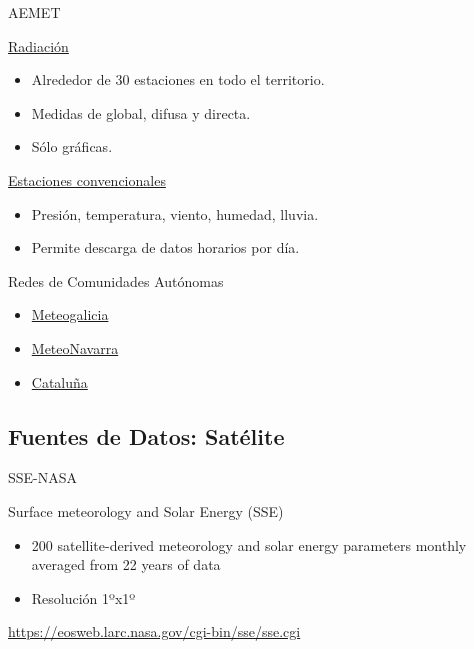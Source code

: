 \documentclass[xcolor={usenames,svgnames,dvipsnames}]{beamer}
\begin{document}
\begin{frame}[label=sec-6-5-6]{AEMET}
\begin{block}{\href{http://www.aemet.es/es/eltiempo/observacion/radiacion}{Radiación}}
\begin{itemize}
\item Alrededor de 30 estaciones en todo el territorio.
\item Medidas de global, difusa y directa.
\item Sólo gráficas.
\end{itemize}
\end{block}

\begin{block}{\href{http://www.aemet.es/es/eltiempo/observacion/ultimosdatos}{Estaciones \guillemotleft{}convencionales\guillemotright{}}}
\begin{itemize}
\item Presión, temperatura, viento, humedad, lluvia.
\item Permite descarga de datos horarios por día.
\end{itemize}
\end{block}
\end{frame}

\begin{frame}[label=sec-6-5-7]{Redes de Comunidades Autónomas}
\begin{itemize}
\item \href{http://www2.meteogalicia.es/galego/observacion/estacions/estacions.asp}{Meteogalicia}
\item \href{http://meteo.navarra.es/estaciones/mapadeestaciones.cfm}{MeteoNavarra}
\item \href{http://www.meteo.cat/xema/AppJava/SeleccioPerComarca.do}{Cataluña}
\end{itemize}
\end{frame}

\subsection{Fuentes de Datos: Satélite}
\label{sec-6-6}

\begin{frame}[label=sec-6-6-1]{SSE-NASA}
\begin{block}{Surface meteorology and Solar Energy (SSE)}
\begin{itemize}
\item 200 satellite-derived meteorology and solar energy parameters
\alert{monthly averaged} from 22 years of data
\item Resolución 1ºx1º
\end{itemize}

\url{https://eosweb.larc.nasa.gov/cgi-bin/sse/sse.cgi}
\end{block}
\end{frame}
\end{document}
